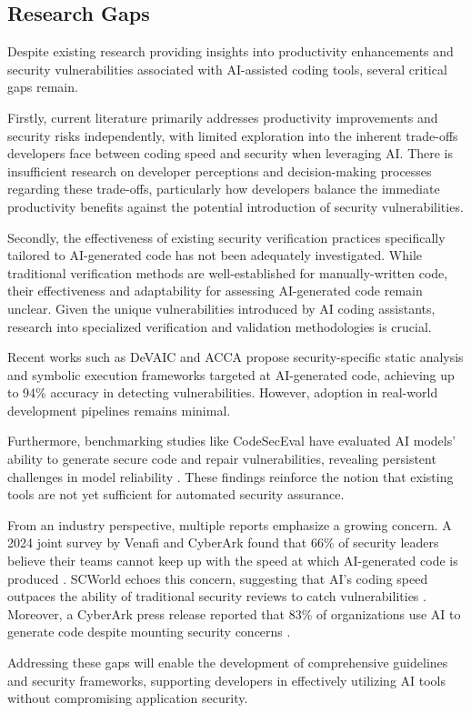 \subsection{Research Gaps}
Despite existing research providing insights into productivity enhancements and security vulnerabilities associated with AI-assisted coding tools, several critical gaps remain.

Firstly, current literature primarily addresses productivity improvements and security risks independently, with limited exploration into the inherent trade-offs developers face between coding speed and security when leveraging AI. There is insufficient research on developer perceptions and decision-making processes regarding these trade-offs, particularly how developers balance the immediate productivity benefits against the potential introduction of security vulnerabilities.

Secondly, the effectiveness of existing security verification practices specifically tailored to AI-generated code has not been adequately investigated. While traditional verification methods are well-established for manually-written code, their effectiveness and adaptability for assessing AI-generated code remain unclear. Given the unique vulnerabilities introduced by AI coding assistants, research into specialized verification and validation methodologies is crucial.

Recent works such as DeVAIC \cite{deluca2024devaic} and ACCA \cite{cotroneo2024acca} propose security-specific static analysis and symbolic execution frameworks targeted at AI-generated code, achieving up to 94\% accuracy in detecting vulnerabilities. However, adoption in real-world development pipelines remains minimal.

Furthermore, benchmarking studies like CodeSecEval have evaluated AI models' ability to generate secure code and repair vulnerabilities, revealing persistent challenges in model reliability \cite{wang2024codesec}. These findings reinforce the notion that existing tools are not yet sufficient for automated security assurance.

From an industry perspective, multiple reports emphasize a growing concern. A 2024 joint survey by Venafi and CyberArk found that 66\% of security leaders believe their teams cannot keep up with the speed at which AI-generated code is produced \cite{venafi2024orgs}. SCWorld echoes this concern, suggesting that AI’s coding speed outpaces the ability of traditional security reviews to catch vulnerabilities \cite{scworld2024ai}. Moreover, a CyberArk press release reported that 83\% of organizations use AI to generate code despite mounting security concerns \cite{cyberark2024press}.

Addressing these gaps will enable the development of comprehensive guidelines and security frameworks, supporting developers in effectively utilizing AI tools without compromising application security.
